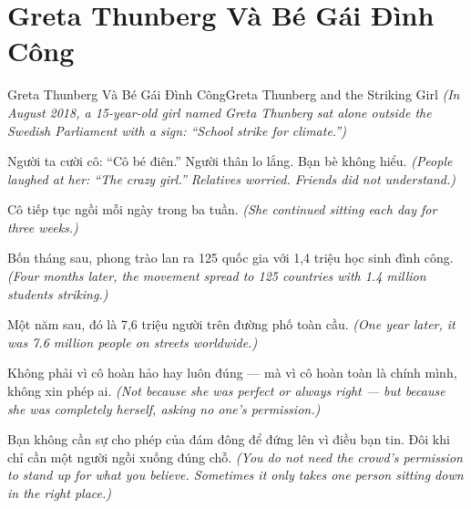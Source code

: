 \section{Greta Thunberg Và Bé Gái Đình Công}
\begin{truyen}{Greta Thunberg Và Bé Gái Đình Công}{Greta Thunberg and the Striking Girl}
\textit{(In August 2018, a 15-year-old girl named Greta Thunberg sat alone outside the Swedish Parliament with a sign: ``School strike for climate.'')}

Người ta cười cô: ``Cô bé điên.'' Người thân lo lắng. Bạn bè không hiểu.
\textit{(People laughed at her: ``The crazy girl.'' Relatives worried. Friends did not understand.)}

Cô tiếp tục ngồi mỗi ngày trong ba tuần.
\textit{(She continued sitting each day for three weeks.)}

Bốn tháng sau, phong trào lan ra 125 quốc gia với 1,4 triệu học sinh đình công.
\textit{(Four months later, the movement spread to 125 countries with 1.4 million students striking.)}

Một năm sau, đó là 7,6 triệu người trên đường phố toàn cầu.
\textit{(One year later, it was 7.6 million people on streets worldwide.)}

Không phải vì cô hoàn hảo hay luôn đúng — mà vì cô hoàn toàn là chính mình, không xin phép ai.
\textit{(Not because she was perfect or always right — but because she was completely herself, asking no one's permission.)}

\end{truyen}

\begin{baihoc}
Bạn không cần sự cho phép của đám đông để đứng lên vì điều bạn tin. Đôi khi chỉ cần một người ngồi xuống đúng chỗ.
\textit{(You do not need the crowd's permission to stand up for what you believe. Sometimes it only takes one person sitting down in the right place.)}
\end{baihoc}
\ngancach

